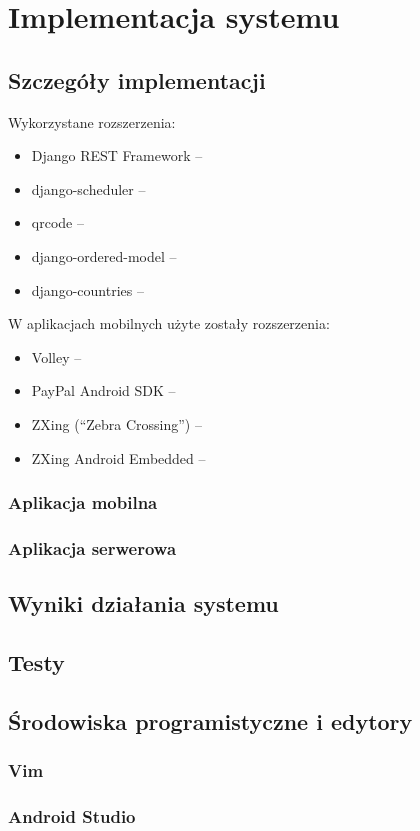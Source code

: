 \section{Implementacja systemu}

\subsection{Szczegóły implementacji}

Wykorzystane rozszerzenia:
\begin{itemize}
	\item Django REST Framework -- 
	\item django-scheduler -- 
	\item qrcode -- 
	\item django-ordered-model -- 
	\item django-countries --
\end{itemize}

W aplikacjach mobilnych użyte zostały rozszerzenia:

\begin{itemize}
	\item Volley --
	\item PayPal Android SDK --
	\item ZXing (``Zebra Crossing'') --
	\item ZXing Android Embedded --
\end{itemize}

\subsubsection*{Aplikacja mobilna}
\subsubsection*{Aplikacja serwerowa}

\subsection{Wyniki działania systemu}

\subsection{Testy}

\subsection{Środowiska programistyczne i edytory}
\subsubsection*{Vim}
\subsubsection*{Android Studio}
